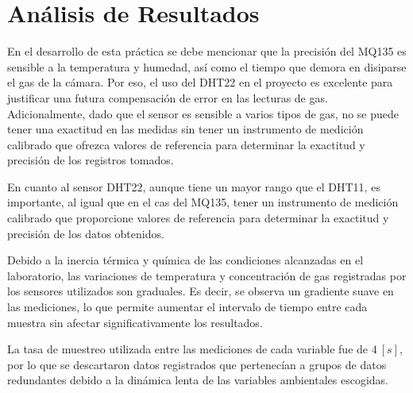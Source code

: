 \section{Análisis de Resultados}

En el desarrollo de esta práctica se debe mencionar que la precisión del MQ135 es sensible a la temperatura y humedad, así como el tiempo que demora en disiparse el gas de la cámara. Por eso, el uso del DHT22 en el proyecto es excelente para justificar una futura compensación de error en las lecturas de gas. Adicionalmente, dado que el sensor es sensible a varios tipos de gas, no se puede tener una exactitud en las medidas sin tener un instrumento de medición calibrado que ofrezca valores de referencia para determinar la exactitud y precisión de los registros tomados.

En cuanto al sensor DHT22, aunque tiene un mayor rango que el DHT11, es importante, al igual que en el cas del MQ135, tener un instrumento de medición calibrado que proporcione valores de referencia para determinar la exactitud y precisión de los datos obtenidos.

Debido a la inercia térmica y química de las condiciones alcanzadas en el laboratorio, las variaciones de temperatura y concentración de gas registradas por los sensores utilizados son graduales. Es decir, se observa un gradiente suave en las mediciones, lo que permite aumentar el intervalo de tiempo entre cada muestra sin afectar significativamente los resultados.

La tasa de muestreo utilizada entre las mediciones de cada variable fue de $4~[s]$, por lo que se descartaron datos registrados que pertenecían a grupos de datos redundantes debido a la dinámica lenta de las variables ambientales escogidas.